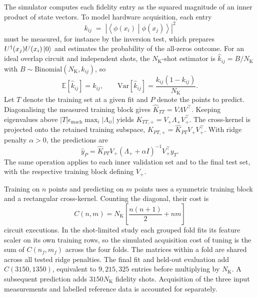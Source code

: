 The simulator computes each fidelity entry as the squared magnitude of an inner
product of state vectors. To model hardware acquisition, each entry
\begin{equation}
    k_{ij} \;=\; \left| \left\langle \phi(x_i) \middle| \phi(x_j) \right\rangle \right|^{2}
    \label{eq:appA_kij}
\end{equation}
must be measured, for instance by the inversion test, which prepares
$U^{\dagger}(x_j) U(x_i) \ket{0}$ and estimates the probability of the all-zeros
outcome. For an ideal overlap circuit and independent shots, the $N_{\mathrm{K}}$-shot estimator is
$\hat{k}_{ij} = B/N_{\mathrm{K}}$ with $B \sim \mathrm{Binomial}(N_{\mathrm{K}}, k_{ij})$, so
\begin{equation}
    \mathbb{E}\!\left[\hat{k}_{ij}\right] = k_{ij},
    \qquad
    \mathrm{Var}\!\left[\hat{k}_{ij}\right] = \frac{k_{ij}(1 - k_{ij})}{N_{\mathrm{K}}}.
    \label{eq:appA_kvar}
\end{equation}
Let $T$ denote the training set at a given fit and $P$ denote the points to
predict. Diagonalising the measured training block gives
$\widehat K_{TT}=V\Lambda V^\top$. Keeping eigenvalues above
$|T|\epsilon_{\mathrm{mach}}\max_i|\Lambda_{ii}|$ yields
$K_{TT,+}=V_+\Lambda_+V_+^\top$. The cross-kernel is projected onto the retained training subspace,
$K_{PT,+}=\widehat K_{PT}V_+V_+^\top$. With ridge penalty $\alpha>0$, the
predictions are
\begin{equation}
    \widehat y_P
    = \widehat K_{PT} V_+
      (\Lambda_+ + \alpha I)^{-1} V_+^\top y_T.
    \label{eq:appA_shot_projection}
\end{equation}
The same operation applies to each inner validation set and to the final test
set, with the respective training block defining $V_+$.

Training on $n$ points and predicting on $m$ points uses a symmetric training
block and a rectangular cross-kernel. Counting the diagonal, their cost is
\begin{equation}
    C(n,m) = N_{\mathrm{K}} \left[ \frac{n(n+1)}{2} + nm \right]
    \label{eq:appA_cost}
\end{equation}
circuit executions. In the shot-limited study each grouped fold fits its feature scaler on its own
training rows, so the simulated acquisition cost of tuning is the sum of
$C(n_f,m_f)$ across the four folds. The matrices within a fold are shared across
all tested ridge penalties. The final fit and held-out evaluation add
$C(3150,1350)$, equivalent to $9{,}215{,}325$ entries before multiplying by
$N_{\mathrm{K}}$. A subsequent prediction adds $3150N_{\mathrm{K}}$ fidelity shots. Acquisition of the
three input measurements and labelled reference data is accounted for separately.


